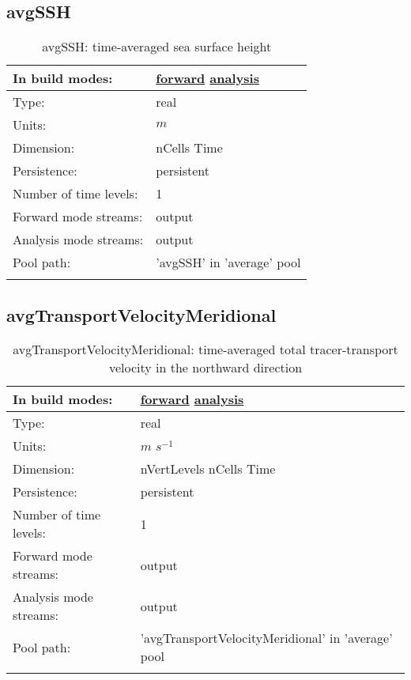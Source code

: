 \subsection[avgSSH]{avgSSH}
\label{subsec:var_sec_average_avgSSH}
\begin{center}
\begin{longtable}{| p{2.0in} | p{4.0in} |}
        \hline 
        In build modes: & \hyperref[subsec:forward_var_tab_average]{forward} \hyperref[subsec:analysis_var_tab_average]{analysis} \\
        \hline 
        Type: & real \\
        \hline 
        Units: & $m$ \\
        \hline 
        Dimension: & nCells Time \\
        \hline 
        Persistence: & persistent \\
        \hline 
        Number of time levels: & 1 \\
        \hline 
		 Forward mode streams: &  output \\
        \hline 
		 Analysis mode streams: &  output \\
        \hline 
            Pool path: & 'avgSSH' in 'average' pool
 \\
		 \hline 
    \caption{avgSSH: time-averaged sea surface height}
\end{longtable}
\end{center}
\subsection[avgTransportVelocityMeridional]{avgTransportVelocityMeridional}
\label{subsec:var_sec_average_avgTransportVelocityMeridional}
\begin{center}
\begin{longtable}{| p{2.0in} | p{4.0in} |}
        \hline 
        In build modes: & \hyperref[subsec:forward_var_tab_average]{forward} \hyperref[subsec:analysis_var_tab_average]{analysis} \\
        \hline 
        Type: & real \\
        \hline 
        Units: & $m$ $s^{-1}$ \\
        \hline 
        Dimension: & nVertLevels nCells Time \\
        \hline 
        Persistence: & persistent \\
        \hline 
        Number of time levels: & 1 \\
        \hline 
		 Forward mode streams: &  output \\
        \hline 
		 Analysis mode streams: &  output \\
        \hline 
            Pool path: & 'avgTransportVelocityMeridional' in 'average' pool
 \\
		 \hline 
    \caption{avgTransportVelocityMeridional: time-averaged total tracer-transport velocity in the northward direction}
\end{longtable}
\end{center}
